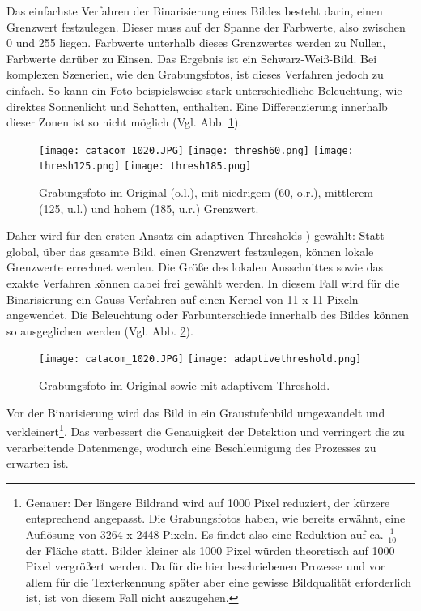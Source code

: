Das einfachste Verfahren der Binarisierung eines Bildes besteht darin, einen Grenzwert festzulegen. Dieser muss auf der Spanne der Farbwerte, also zwischen 0 und 255 liegen.  Farbwerte unterhalb dieses Grenzwertes werden zu Nullen, Farbwerte darüber zu Einsen. Das Ergebnis ist ein Schwarz-Weiß-Bild. Bei komplexen Szenerien, wie den Grabungsfotos, ist dieses Verfahren jedoch zu einfach. So kann ein Foto beispielsweise stark unterschiedliche Beleuchtung, wie direktes Sonnenlicht und Schatten, enthalten. Eine Differenzierung innerhalb dieser Zonen ist so nicht möglich (Vgl. Abb. \ref{fig:threshold}).\\
\begin{figure}[h!]
\texttt{[image: catacom\_1020.JPG]}
\texttt{[image: thresh60.png]}
\texttt{[image: thresh125.png]}
\texttt{[image: thresh185.png]}
\caption{Grabungsfoto im Original (o.l.), mit niedrigem (60, o.r.), mittlerem (125, u.l.) und hohem (185, u.r.) Grenzwert.}
\label{fig:threshold}
\end{figure}
Daher wird für den ersten Ansatz ein adaptiven Thresholds \cite{opencvadaptivethreshold}) gewählt: Statt global, über das gesamte Bild, einen Grenzwert festzulegen, können lokale Grenzwerte errechnet werden. Die Größe des lokalen Ausschnittes sowie das exakte Verfahren können dabei frei gewählt werden. In diesem Fall wird für die Binarisierung ein Gauss-Verfahren auf einen Kernel von 11 x 11 Pixeln angewendet. Die Beleuchtung oder Farbunterschiede innerhalb des Bildes können so ausgeglichen werden (Vgl. Abb. \ref{fig:adaptivethreshold}).
\begin{figure}[h!]
\texttt{[image: catacom\_1020.JPG]}
\texttt{[image: adaptivethreshold.png]}
\caption{Grabungsfoto im Original sowie mit adaptivem Threshold.}
\label{fig:adaptivethreshold}
\end{figure}
Vor der Binarisierung wird das Bild in ein Graustufenbild umgewandelt und verkleinert\footnote{Genauer: Der längere Bildrand wird auf 1000 Pixel reduziert, der kürzere entsprechend angepasst. Die Grabungsfotos haben, wie bereits erwähnt, eine Auflösung von 3264 x 2448 Pixeln. Es findet also eine Reduktion auf ca. $\frac{1}{10}$ der Fläche statt. Bilder kleiner als 1000 Pixel würden theoretisch auf 1000 Pixel vergrößert werden. Da für die hier beschriebenen Prozesse und vor allem für die Texterkennung später aber eine gewisse Bildqualität erforderlich ist, ist von diesem Fall nicht auszugehen.}. Das verbessert die Genauigkeit der Detektion und verringert die zu verarbeitende Datenmenge, wodurch eine Beschleunigung des Prozesses zu erwarten ist. %

